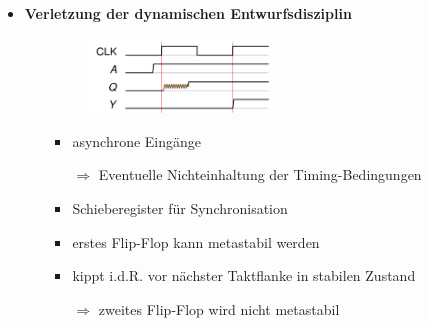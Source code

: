 \documentclass[11pt,a4paper]{article}
\begin{document}
\begin{itemize}
\item \textbf{Verletzung der dynamischen Entwurfsdisziplin}
	\begin{itemize}
	\item[]		
				\begin{minipage}{0.25\textwidth}
					\begin{figure}[H]
					\includegraphics[height=2cm]{Bilder/verletzungdyn}
					\end{figure}
				\end{minipage}
				\begin{minipage}[t]{0.65\textwidth}
					\vspace{-1.5cm}
					\begin{itemize}
					\item asynchrone Eingänge 
					\item[$\Rightarrow$]Eventuelle Nichteinhaltung der Timing-Bedingungen
					\item Schieberegister für Synchronisation
					\item erstes Flip-Flop kann metastabil werden
					\item kippt i.d.R. vor nächster Taktflanke in stabilen Zustand
					\item[$\Rightarrow$] zweites Flip-Flop wird nicht metastabil
					\end{itemize}
				\end{minipage}
	

	\end{itemize}
	
\end{itemize}
\end{document}

